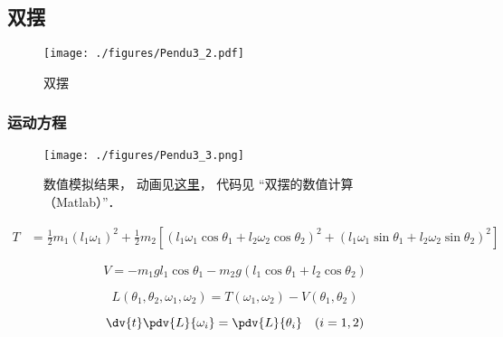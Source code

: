 
\begin{issues}
\issueDraft
\end{issues}


\subsection{双摆}
\begin{figure}[ht]
\centering
\texttt{[image: ./figures/Pendu3\_2.pdf]}
\caption{双摆} \label{Pendu3_fig2}
\end{figure}

\subsubsection{运动方程}
\begin{figure}[ht]
\centering
\texttt{[image: ./figures/Pendu3\_3.png]}
\caption{数值模拟结果， 动画见\href{https://wuli.wiki/apps/DbPend.html}{这里}， 代码见 “双摆的数值计算（Matlab）”．} \label{Pendu3_fig3}
\end{figure}

\begin{equation}
\begin{aligned}
T &= \frac{1}{2} m_1 (l_1 \omega_1)^2 + \frac{1}{2} m_2 [(l_1 \omega_1 \cos\theta_1 + l_2 \omega_2 \cos\theta_2)^2 + (l_1 \omega_1 \sin\theta_1 + l_2 \omega_2 \sin\theta_2)^2]
\end{aligned}
\end{equation}

\begin{equation}  
V = -m_1 g l_1 \cos \theta_1 - m_2 g (l_1\cos \theta_1 + l_2 \cos \theta_2)
\end{equation}

\begin{equation}
L(\theta_1, \theta_2, \omega_1, \omega_2) = T(\omega_1, \omega_2) - V(\theta_1, \theta_2)
\end{equation}

\begin{equation}\label{Pendu3_eq1}
\dv{t}\pdv{L}{\omega_i} = \pdv{L}{\theta_i} \quad (i=1,2)
\end{equation}

